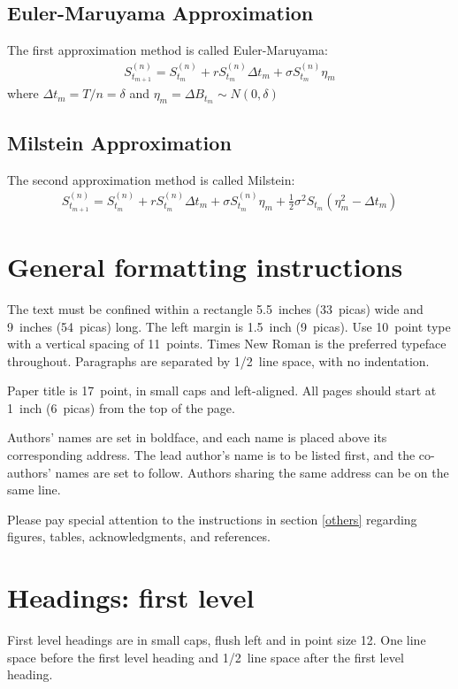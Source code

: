 \documentclass{article} %
\begin{document}
\subsection{Euler-Maruyama Approximation}
The first approximation method is called Euler-Maruyama:
\begin{align}
  S_{t_{m+1}}^{(n)}=S_{t_{m}}^{(n)}+rS_{t_{m}}^{(n)}\Delta t_{m}+\sigma S_{t_{m}}^{(n)}\eta_{m}
\end{align}
where $\Delta t_{m}=T/n=\delta$ and $\eta_{m}=\Delta B_{t_{m}}\sim N(0,\delta)$

\subsection{Milstein Approximation}
The second approximation method is called Milstein:
\begin{align}
  S_{t_{m+1}}^{(n)}=S_{t_{m}}^{(n)}+rS_{t_{m}}^{(n)}\Delta t_{m}+\sigma S_{t_{m}}^{(n)}\eta_{m}+\frac{1}{2}\sigma^{2}S_{t_{m}}(\eta_{m}^{2}-\Delta t_{m})
\end{align}
\section{General formatting instructions}
\label{gen_inst}

The text must be confined within a rectangle 5.5~inches (33~picas) wide and
9~inches (54~picas) long. The left margin is 1.5~inch (9~picas).
Use 10~point type with a vertical spacing of 11~points. Times New Roman is the
preferred typeface throughout. Paragraphs are separated by 1/2~line space,
with no indentation.

Paper title is 17~point, in small caps and left-aligned.
All pages should start at 1~inch (6~picas) from the top of the page.

Authors' names are
set in boldface, and each name is placed above its corresponding
address. The lead author's name is to be listed first, and
the co-authors' names are set to follow. Authors sharing the
same address can be on the same line.

Please pay special attention to the instructions in section \ref{others}
regarding figures, tables, acknowledgments, and references.

\section{Headings: first level}
\label{headings}

First level headings are in small caps,
flush left and in point size 12. One line space before the first level
heading and 1/2~line space after the first level heading.
\end{document}
